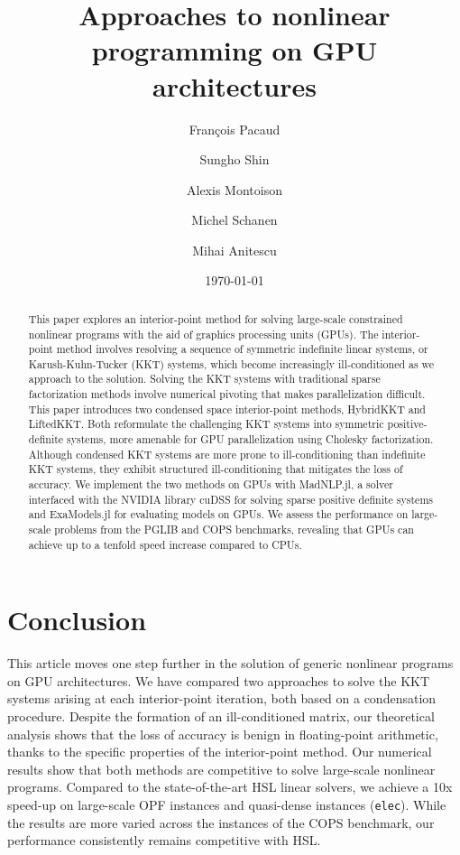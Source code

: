\documentclass[smallextended]{svjour3}
\title{Approaches to nonlinear programming on GPU architectures}
\author{François Pacaud \and
Sungho Shin \and
Alexis Montoison \and
Michel Schanen \and
Mihai Anitescu
}
\date{\today}
\begin{document}
\maketitle

\begin{abstract}
  This paper explores an interior-point method for solving large-scale constrained nonlinear programs with the aid of graphics processing units (GPUs).
  The interior-point method involves resolving a sequence of symmetric indefinite linear systems, or Karush-Kuhn-Tucker (KKT) systems,
  which become increasingly ill-conditioned as we approach to the solution.
  Solving the KKT systems with traditional sparse factorization methods involve numerical pivoting that makes parallelization difficult.
  This paper introduces two condensed space interior-point methods, HybridKKT and LiftedKKT.
  Both reformulate the challenging KKT systems into symmetric positive-definite systems, more amenable for GPU parallelization using Cholesky factorization.
  Although condensed KKT systems are more prone to ill-conditioning than indefinite KKT systems, they exhibit structured ill-conditioning that mitigates the loss of accuracy.
  We implement the two methods on GPUs with MadNLP.jl, a solver interfaced with the NVIDIA library cuDSS for solving sparse positive definite systems and ExaModels.jl for evaluating models on GPUs.
  We assess the performance on large-scale problems from the PGLIB and COPS benchmarks, revealing that GPUs can achieve up to a tenfold speed increase compared to CPUs.
\end{abstract}










\section{Conclusion}
This article moves one step further in the solution of generic nonlinear
programs on GPU architectures. We have compared two approaches
to solve the KKT systems arising at each interior-point iteration, both
based on a condensation procedure.
Despite the formation of an ill-conditioned matrix, our theoretical analysis shows that the loss of accuracy is benign in floating-point arithmetic, thanks to the specific properties of the interior-point method.
Our numerical results show that both methods are competitive to solve large-scale
nonlinear programs.
Compared to the state-of-the-art HSL linear solvers, we achieve a 10x speed-up on large-scale OPF instances and quasi-dense instances (\texttt{elec}). While the results are more varied across the instances of the COPS benchmark, our performance consistently remains competitive with HSL.
\end{document}
